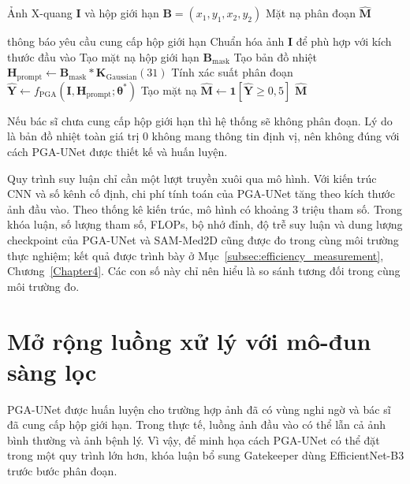 \begin{algorithm}[H]
\caption{Quy trình suy luận PGA-UNet}
\label{alg:online}
\begin{algorithmic}[1]
\Require Ảnh X-quang $\mathbf{I}$ và hộp giới hạn
$\mathbf{B}=(x_1,y_1,x_2,y_2)$
\Ensure Mặt nạ phân đoạn $\widehat{\mathbf{M}}$

    \State \Return thông báo yêu cầu cung cấp hộp giới hạn
\EndIf
\State Chuẩn hóa ảnh $\mathbf{I}$ để phù hợp với kích thước đầu vào
\State Tạo mặt nạ hộp giới hạn $\mathbf{B}_{\mathrm{mask}}$
\State Tạo bản đồ nhiệt
$\mathbf{H}_{\mathrm{prompt}}
\leftarrow
\mathbf{B}_{\mathrm{mask}}
\ast
\mathbf{K}_{\mathrm{Gaussian}}(31)$
\State Tính xác suất phân đoạn
$\widehat{\mathbf{Y}}
\leftarrow
f_{\mathrm{PGA}}
(\mathbf{I},\mathbf{H}_{\mathrm{prompt}};\boldsymbol{\theta}^{*})$
\State Tạo mặt nạ
$\widehat{\mathbf{M}}
\leftarrow
\mathbf{1}[\widehat{\mathbf{Y}}\geq0{,}5]$
\State \Return $\widehat{\mathbf{M}}$
\end{algorithmic}
\end{algorithm}

Nếu bác sĩ chưa cung cấp hộp giới hạn thì hệ thống sẽ không phân đoạn. Lý do là bản đồ nhiệt toàn giá trị 0 không mang thông tin định vị, nên không đúng với cách PGA-UNet được thiết kế và huấn luyện.

Quy trình suy luận chỉ cần một lượt truyền xuôi qua mô hình. Với kiến trúc CNN và số kênh cố định, chi phí tính toán của PGA-UNet tăng theo kích thước ảnh đầu vào. Theo thống kê kiến trúc, mô hình có khoảng 3 triệu tham số. Trong khóa luận, số lượng tham số, FLOPs, bộ nhớ đỉnh, độ trễ suy luận và dung lượng checkpoint của PGA-UNet và SAM-Med2D cũng được đo trong cùng môi trường thực nghiệm; kết quả được trình bày ở Mục~\ref{subsec:efficiency_measurement}, Chương~\ref{Chapter4}. Các con số này chỉ nên hiểu là so sánh tương đối trong cùng môi trường đo.

\section{Mở rộng luồng xử lý với mô-đun sàng lọc}
\label{sec:tong_the}

PGA-UNet được huấn luyện cho trường hợp ảnh đã có vùng nghi ngờ và bác sĩ đã cung cấp hộp giới hạn. Trong thực tế, luồng ảnh đầu vào có thể lẫn cả ảnh bình thường và ảnh bệnh lý. Vì vậy, để minh họa cách PGA-UNet có thể đặt trong một quy trình lớn hơn, khóa luận bổ sung Gatekeeper dùng EfficientNet-B3 trước bước phân đoạn.

